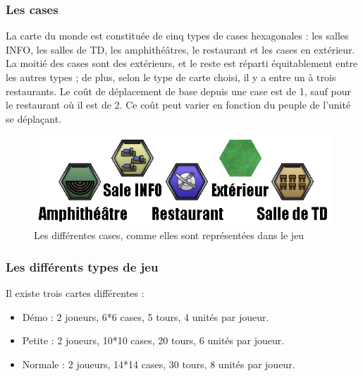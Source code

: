 \subsubsection{Les cases}
La carte du monde est constituée de cinq types de cases hexagonales : les salles INFO, les salles de TD, les amphithéâtres, le restaurant et les cases en extérieur.
La moitié des cases sont des extérieurs, et le reste est réparti équitablement entre les autres types ; de plus, selon le type de carte choisi, il y a entre un à trois restaurants.
Le coût de déplacement de base depuis une case est de 1, sauf pour le restaurant où il est de 2. Ce coût peut varier en fonction du peuple de l'unité se déplaçant.

\begin{figure}[!h]
\centering
\includegraphics[width=.7\textwidth]{Parties/Images/Terrains.png}
\caption{Les différentes cases, comme elles sont représentées dans le jeu}
\label{fig:Terrains}
\end{figure}


\subsubsection{Les différents types de jeu} \label{sec:typesJeu}
Il existe trois cartes différentes :
\begin{itemize}
\item Démo : 2 joueurs, 6*6 cases, 5 tours, 4 unités par joueur.
\item Petite : 2 joueurs, 10*10 cases, 20 tours, 6 unités par joueur.
\item Normale : 2 joueurs, 14*14 cases, 30 tours, 8 unités par joueur.
\end{itemize}